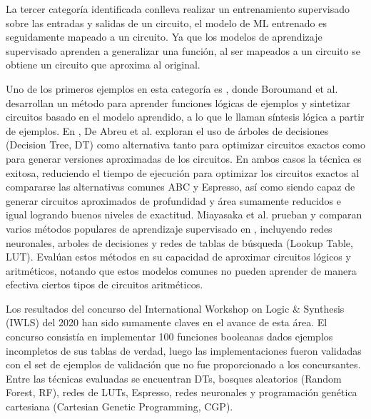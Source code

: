 La tercer categoría identificada conlleva realizar un entrenamiento supervisado
sobre las entradas y salidas de un circuito, el modelo de ML entrenado es
seguidamente mapeado a un circuito. Ya que los modelos de aprendizaje
supervisado aprenden a generalizar una función, al ser mapeados a un circuito
se obtiene un circuito que aproxima al original.

Uno de los primeros ejemplos en esta categoría es
\cite{boroumand_learning_2021}, donde Boroumand et al. desarrollan un método
para aprender funciones lógicas de ejemplos y sintetizar circuitos basado en el
modelo aprendido, a lo que le llaman síntesis lógica a partir de ejemplos. En
\cite{de_abreu_fast_2021}, De Abreu et al. exploran el uso de árboles de
decisiones (Decision Tree, DT) como alternativa tanto para optimizar
circuitos exactos como para generar versiones aproximadas de los circuitos. En
ambos casos la técnica es exitosa, reduciendo el tiempo de ejecución para
optimizar los circuitos exactos al compararse las alternativas comunes ABC y
Espresso, así como siendo capaz de generar circuitos aproximados de profundidad
y área sumamente reducidos e igual logrando buenos niveles de exactitud.
Miayasaka et al. prueban y comparan varios métodos populares de aprendizaje
supervisado en \cite{miyasaka_logic_2021}, incluyendo redes neuronales, arboles
de decisiones y redes de tablas de búsqueda (Lookup Table, LUT).
Evalúan estos métodos en su capacidad de aproximar circuitos lógicos y
aritméticos, notando que estos modelos comunes no pueden aprender de manera
efectiva ciertos tipos de circuitos aritméticos.

Los resultados del concurso del International Workshop on Logic \& Synthesis
(IWLS) del 2020 \cite{rai_logic_2021} han sido sumamente claves en el avance de
esta área. El concurso consistía en implementar 100 funciones booleanas dados
ejemplos incompletos de sus tablas de verdad, luego las implementaciones fueron
validadas con el set de ejemplos de validación que no fue proporcionado a los
concursantes. Entre las técnicas evaluadas se encuentran DTs, bosques
aleatorios (Random Forest, RF), redes de LUTs, Espresso, redes neuronales y
programación genética cartesiana (Cartesian Genetic Programming, CGP).


